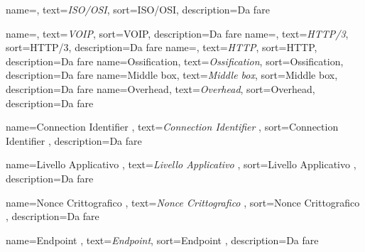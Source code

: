  {
    name=,
    text=\emph{ISO/OSI},
    sort=ISO/OSI,
    description={Da fare}
}

 {
    name=,
    text=\emph{VOIP},
    sort=VOIP,
    description={Da fare}
}
 {
    name=,
    text=\emph{HTTP/3},
    sort=HTTP/3,
    description={Da fare}
}
 {
    name=,
    text=\emph{HTTP},
    sort=HTTP,
    description={Da fare}
}
 {
    name=Ossification,
    text=\emph{Ossification},
    sort=Ossification,
    description={Da fare}
}
 {
    name=Middle box,
    text=\emph{Middle box},
    sort=Middle box,
    description={Da fare}
}
 {
    name=Overhead,
    text=\emph{Overhead},
    sort=Overhead,
    description={Da fare}
}

 {
    name=Connection Identifier ,
    text=\emph{Connection Identifier },
    sort=Connection Identifier ,
    description={Da fare}
}

 {
    name=Livello Applicativo ,
    text=\emph{Livello Applicativo },
    sort=Livello Applicativo ,
    description={Da fare}
}

 {
    name=Nonce Crittografico ,
    text=\emph{Nonce Crittografico },
    sort=Nonce Crittografico ,
    description={Da fare}
}

 {
    name=Endpoint ,
    text=\emph{Endpoint},
    sort=Endpoint ,
    description={Da fare}
}